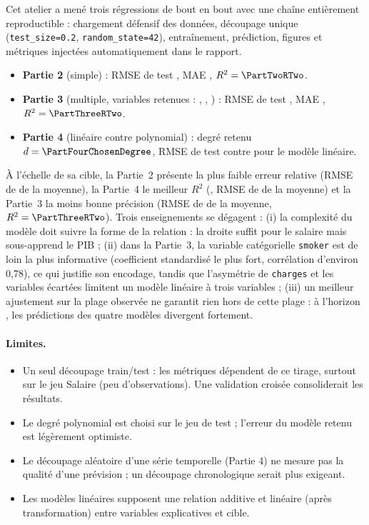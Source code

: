 \documentclass[11pt,a4paper]{report}
\begin{document}
Cet atelier a men\'e trois r\'egressions de bout en bout avec une cha\^ine enti\`erement
reproductible : chargement d\'efensif des donn\'ees, d\'ecoupage unique
(\texttt{test\_size=0.2}, \texttt{random\_state=42}), entra\^inement, pr\'ediction, figures et
m\'etriques inject\'ees automatiquement dans le rapport.

\begin{itemize}
  \item \textbf{Partie 2} (simple) : RMSE de test \PartTwoRMSE{}, MAE \PartTwoMAE{},
        $R^2=\PartTwoRTwo$.
  \item \textbf{Partie 3} (multiple, variables retenues : \PartThreeFeatureOne{},
        \PartThreeFeatureTwo{}, \PartThreeFeatureThree{}) : RMSE de test \PartThreeRMSE{}, MAE
        \PartThreeMAE{}, $R^2=\PartThreeRTwo$.
  \item \textbf{Partie 4} (lin\'eaire contre polynomial) : degr\'e retenu
        $d=\PartFourChosenDegree$, RMSE de test \PartFourChosenRMSE{} contre
        \PartFourLinearRMSE{} pour le mod\`ele lin\'eaire.
\end{itemize}

À l'échelle de sa cible, la Partie~2 présente la plus faible erreur relative (RMSE de \PartTwoRMSEPct{} de la moyenne), la Partie~4 le meilleur $R^2$ (\PartFourChosenRTwo{}, RMSE de \PartFourChosenRMSEPct{} de la moyenne) et la Partie~3 la moins bonne précision (RMSE de \PartThreeRMSEPct{} de la moyenne, $R^2=\PartThreeRTwo$). Trois enseignements se dégagent : (i) la complexité du modèle doit suivre la forme de la relation : la droite suffit pour le salaire mais sous-apprend le PIB ; (ii) dans la Partie~3, la variable catégorielle \texttt{smoker} est de loin la plus informative (coefficient standardisé le plus fort, corrélation d'environ 0,78), ce qui justifie son encodage, tandis que l'asymétrie de \texttt{charges} et les variables écartées limitent un modèle linéaire à trois variables ; (iii) un meilleur ajustement sur la plage observée ne garantit rien hors de cette plage : à l'horizon \PartFourExtrapYear{}, les prédictions des quatre modèles divergent fortement.

\paragraph{Limites.}
\begin{itemize}
  \item Un seul d\'ecoupage train/test : les m\'etriques d\'ependent de ce tirage, surtout sur
        le jeu Salaire (peu d'observations). Une validation crois\'ee consoliderait les r\'esultats.
  \item Le degr\'e polynomial est choisi sur le jeu de test ; l'erreur du mod\`ele retenu est
        l\'eg\`erement optimiste.
  \item Le d\'ecoupage al\'eatoire d'une s\'erie temporelle (Partie 4) ne mesure pas la qualit\'e
        d'une pr\'evision ; un d\'ecoupage chronologique serait plus exigeant.
  \item Les modèles lin\'eaires supposent une relation additive et lin\'eaire (apr\`es
        transformation) entre variables explicatives et cible.
\end{itemize}
\end{document}
